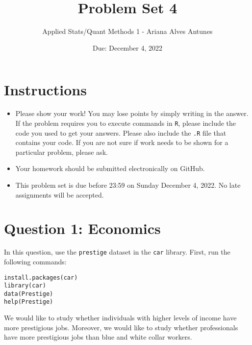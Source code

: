 \documentclass[12pt,letterpaper]{article}
\title{Problem Set 4}
\date{Due: December 4, 2022}
\author{Applied Stats/Quant Methods 1 - Ariana Alves Antunes}
\begin{document}
	\maketitle
	\section*{Instructions}
	\begin{itemize}
		\item Please show your work! You may lose points by simply writing in the answer. If the problem requires you to execute commands in \texttt{R}, please include the code you used to get your answers. Please also include the \texttt{.R} file that contains your code. If you are not sure if work needs to be shown for a particular problem, please ask.
		\item Your homework should be submitted electronically on GitHub.
		\item This problem set is due before 23:59 on Sunday December 4, 2022. No late assignments will be accepted.
	\end{itemize}



	\vspace{.5cm}
\section*{Question 1: Economics}
\vspace{.25cm}
\noindent 	
In this question, use the \texttt{prestige} dataset in the \texttt{car} library. First, run the following commands:

\begin{verbatim}
install.packages(car)
library(car)
data(Prestige)
help(Prestige)
\end{verbatim} 


\noindent We would like to study whether individuals with higher levels of income have more prestigious jobs. Moreover, we would like to study whether professionals have more prestigious jobs than blue and white collar workers.
\end{document}
